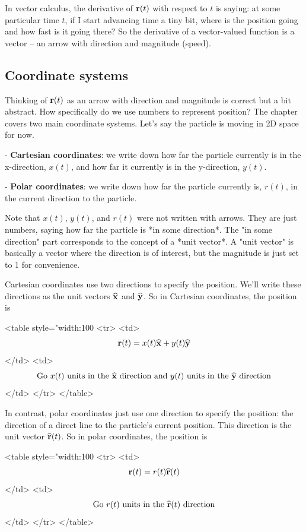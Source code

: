 In vector calculus, the derivative of $\mathbf{r}(t)$ with respect to $t$ is saying: at
some particular time $t$, if I start advancing time a tiny bit, where is the
position going and how fast is it going there? So the derivative of a
vector-valued function is a vector -- an arrow with direction and magnitude
(speed).


\subsection{Coordinate systems}

Thinking of $\mathbf{r}(t)$ as an arrow with direction and magnitude is correct but a
bit abstract. How specifically do we use numbers to represent position? The
chapter covers two main coordinate systems. Let's say the particle is moving in
2D space for now.

- \textbf{Cartesian coordinates}: we write down how far the particle currently is in
the x-direction, $x(t)$, and how far it currently is in the y-direction,
$y(t)$.

- \textbf{Polar coordinates}: we write down how far the particle currently is,
$r(t)$, in the current direction to the particle.

Note that $x(t)$, $y(t)$, and $r(t)$ were not written with arrows. They are
just numbers, saying how far the particle is *in some direction*. The "in some
direction" part corresponds to the concept of a *unit vector*. A "unit vector"
is basically a vector where the direction is of interest, but the magnitude is
just set to 1 for convenience.

Cartesian coordinates use two directions to specify the position. We'll write
these directions as the unit vectors $\mathbf{\widehat{x}}$ and $\mathbf{\widehat{y}}$. So in Cartesian
coordinates, the position is

<table style="width:100%
<tr>
<td> $$\mathbf{r}(t) = x(t)\mathbf{\widehat{x}} + y(t)\mathbf{\widehat{y}}$$ </td>
<td> $$\mathrm{Go~} x(t) \mathrm{~units~in~the~} \mathbf{\widehat{x}} \mathrm{~direction} \mathrm{~and~} y(t) \mathrm{~units~in~the~} \mathbf{\widehat{y}} \mathrm{~direction}$$ </td>
</tr>
</table>

In contrast, polar coordinates just use one direction to specify the position:
the direction of a direct line to the particle's current position. This
direction is the unit vector $\mathbf{\widehat{r}}(t)$. So in polar
coordinates, the position is


<table style="width:100%
<tr>
<td> $$\mathbf{r}(t) = r(t)\mathbf{\widehat{r}}(t)$$ </td>
<td> $$\mathrm{Go~} r(t) \mathrm{~units~in~the~} \mathbf{\widehat{r}}(t) \mathrm{~direction}$$ </td>
</tr>
</table>


